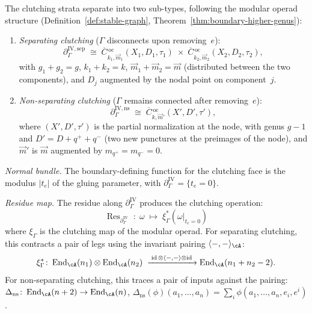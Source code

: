 \begin{proposition}
The clutching strata separate into two sub-types, following
the modular operad structure
(Definition~\ref{def:stable-graph},
Theorem~\ref{thm:boundary-higher-genus}):
\begin{enumerate}[label=\textup{(\alph*)}]
\item \emph{Separating clutching}
 ($\Gamma$ disconnects upon removing~$e$):
 \begin{equation}\label{eq:separating-clutching}
 \partial_\Gamma^{\mathrm{IV,sep}}
 \;\cong\;
 \overline{C}{}^{\,\mathrm{oc}}_{k_1, \vec{m}_1}
 (X_1, D_1, \tau_1)
 \;\times\;
 \overline{C}{}^{\,\mathrm{oc}}_{k_2, \vec{m}_2}
 (X_2, D_2, \tau_2),
 \end{equation}
 with $g_1 + g_2 = g$, $k_1 + k_2 = k$,
 $\vec{m}_1 + \vec{m}_2 = \vec{m}$ (distributed between the
 two components), and $D_j$ augmented by the nodal point
 on component~$j$.
\item \emph{Non-separating clutching}
 ($\Gamma$ remains connected after removing~$e$):
 \begin{equation}\label{eq:nonseparating-clutching}
 \partial_\Gamma^{\mathrm{IV,ns}}
 \;\cong\;
 \overline{C}{}^{\,\mathrm{oc}}_{k, \vec{m}'}
 (X', D', \tau'),
 \end{equation}
 where $(X', D', \tau')$ is the partial normalization at the
 node, with genus $g - 1$ and $D' = D + q^+ + q^-$ (two new
 punctures at the preimages of the node), and $\vec{m}'$ is
 $\vec{m}$ augmented by $m_{q^+} = m_{q^-} = 0$.
\end{enumerate}

\emph{Normal bundle.}
The boundary-defining function for the clutching face is the
modulus $|t_e|$ of the gluing parameter, with
$\partial_\Gamma^{\mathrm{IV}} = \{t_e = 0\}$.

\emph{Residue map.}
The residue along $\partial_\Gamma^{\mathrm{IV}}$ produces the
clutching operation:
\begin{equation}\label{eq:typeIV-residue}
\operatorname{Res}_{\partial_\Gamma^{\mathrm{IV}}}
\;\colon\;
\omega \;\longmapsto\;
\xi_\Gamma^*(\omega|_{t_e = 0})
\end{equation}
where $\xi_\Gamma$ is the clutching map of the modular operad.
For separating clutching, this contracts a pair of legs
using the invariant pairing $\langle -, - \rangle_\cA$:
\[
\xi_\Gamma^*\colon
\operatorname{End}_\cA(n_1) \otimes \operatorname{End}_\cA(n_2)
\;\xrightarrow{\;\operatorname{id} \otimes \langle -,-\rangle
\otimes \operatorname{id}\;}
\operatorname{End}_\cA(n_1 + n_2 - 2).
\]
For non-separating clutching, this traces a pair of inputs
against the pairing:
$\Delta_{\mathrm{ns}} \colon
\operatorname{End}_\cA(n+2) \to \operatorname{End}_\cA(n)$,
$\Delta_{\mathrm{ns}}(\phi)(a_1, \ldots, a_n)
= \sum_i \phi(a_1, \ldots, a_n, e_i, e^i)$.
\end{proposition}

